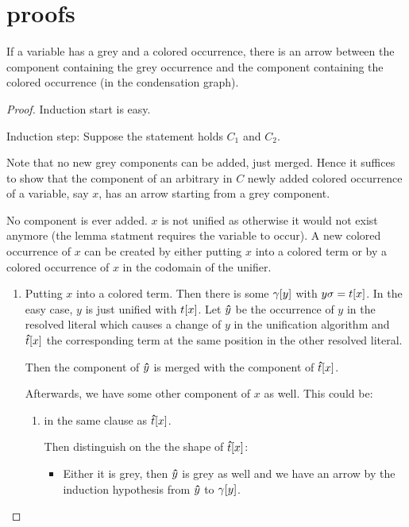 \documentclass[,%
	paper=a4,%
	DIV10, %
	twoside=false,%
	liststotoc,
	bibtotoc,
	draft=false,%
	numbers=noendperiod
]{scrartcl}
\begin{document}
\section*{proofs}
\begin{conj}[Lemma 1]
	If a variable has a grey and a colored occurrence, there is an arrow between the component containing the grey occurrence and the component containing the colored occurrence (in the condensation graph).
\end{conj}
\begin{proof}
	Induction start is easy.
	
	Induction step:
	Suppose the statement holds $C_1$ and $C_2$.

	Note that no new grey components can be added, just merged.
	Hence it suffices to show that the component of an arbitrary in $C$ newly added colored occurrence of a variable, say $x$, has an arrow starting from a grey component.

	No component is ever added. $x$ is not unified as otherwise it would not exist anymore (the lemma statment requires the variable to occur).
	A new colored occurrence of $x$ can be created by either putting $x$ into a colored term or by a colored occurrence of $x$ in the codomain of the unifier.

	\begin{enumerate}
			\item Putting $x$ into a colored term.
				Then there is some $\gamma[y]$ with $y\sigma = t[x]$.
				In the easy case, $y$ is just unified with $t[x]$.
				Let $\bm\hat y $ be the occurrence of $y$ in the resolved literal which causes a change of $y$ in the unification algorithm and $\bm\hat t[x]$ the corresponding term at the same position in the other resolved literal.

				Then the component of $\bm\hat y$ is merged with the component of $\bm\hat t[x]$.
				
				Afterwards, we have some other component of $x$ as well. This could be:
				\begin{enumerate}
					\item in the same clause as $\bm\hat t[x]$.

						Then distinguish on the the shape of $\bm\hat t[x]$:
						
						\begin{itemize}
								\item
						Either it is grey, then $\bm\hat y$ is grey as well and we have an arrow by the induction hypothesis from $\bm\hat y$ to $\gamma[y]$.


\end{itemize}
\end{enumerate}
\end{enumerate}
\end{proof}
\end{document}
